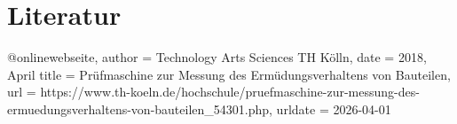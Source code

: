 %
%
%
\chapter{Literatur}%

@online{webseite,
 	author = {{Technology Arts Sciences TH Kölln}},
	date = {2018, April}
 	title = {{Prüfmaschine zur Messung des Ermüdungsverhaltens von Bauteilen}},
	url = {https://www.th-koeln.de/hochschule/pruefmaschine-zur-messung-des-ermuedungsverhaltens-von-bauteilen_54301.php},
	urldate  = {2026-04-01}
}



